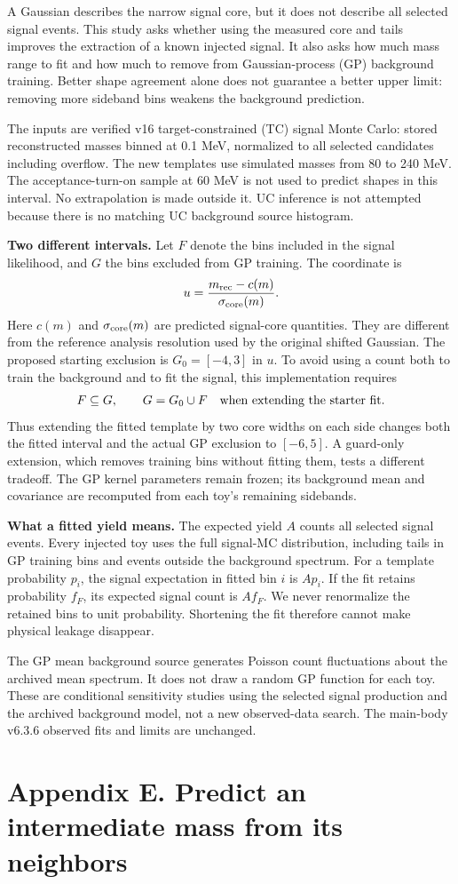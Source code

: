 \documentclass[11pt]{article}
\begin{document}
A Gaussian describes the narrow signal core, but it does not describe all selected signal events. This study asks whether using the measured core and tails improves the extraction of a known injected signal. It also asks how much mass range to fit and how much to remove from Gaussian-process (GP) background training. Better shape agreement alone does not guarantee a better upper limit: removing more sideband bins weakens the background prediction.

The inputs are verified v16 target-constrained (TC) signal Monte Carlo: stored reconstructed masses binned at 0.1 MeV, normalized to all selected candidates including overflow. The new templates use simulated masses from 80 to 240 MeV. The acceptance-turn-on sample at 60 MeV is not used to predict shapes in this interval. No extrapolation is made outside it. UC inference is not attempted because there is no matching UC background source histogram.

\textbf{Two different intervals.} Let $F$ denote the bins included in the signal likelihood, and $G$ the bins excluded from GP training. The coordinate is
\[
 u=\frac{m_{\rm rec}-c(m)}{\sigma_{\rm core}(m)}.
\]
Here $c(m)$ and $\sigma_{\rm core}(m)$ are predicted signal-core quantities. They are different from the reference analysis resolution used by the original shifted Gaussian. The proposed starting exclusion is $G_0=[-4,3]$ in $u$. To avoid using a count both to train the background and to fit the signal, this implementation requires
\[
 F\subseteq G,\qquad G=G_0\cup F\quad\hbox{when extending the starter fit.}
\]
Thus extending the fitted template by two core widths on each side changes both the fitted interval and the actual GP exclusion to $[-6,5]$. A guard-only extension, which removes training bins without fitting them, tests a different tradeoff. The GP kernel parameters remain frozen; its background mean and covariance are recomputed from each toy's remaining sidebands.

\textbf{What a fitted yield means.} The expected yield $A$ counts all selected signal events. Every injected toy uses the full signal-MC distribution, including tails in GP training bins and events outside the background spectrum. For a template probability $p_i$, the signal expectation in fitted bin $i$ is $A p_i$. If the fit retains probability $f_F$, its expected signal count is $A f_F$. We never renormalize the retained bins to unit probability. Shortening the fit therefore cannot make physical leakage disappear.

The GP mean background source generates Poisson count fluctuations about the archived mean spectrum. It does not draw a random GP function for each toy. These are conditional sensitivity studies using the selected signal production and the archived background model, not a new observed-data search. The main-body v6.3.6 observed fits and limits are unchanged.
\clearpage\section*{Appendix E. Predict an intermediate mass from its neighbors}
\end{document}
